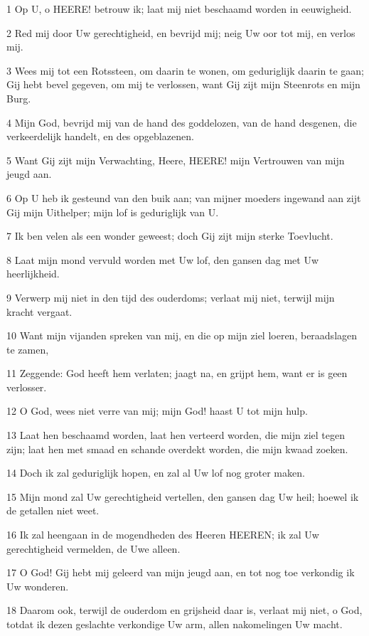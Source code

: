 \par 1 Op U, o HEERE! betrouw ik; laat mij niet beschaamd worden in eeuwigheid.
\par 2 Red mij door Uw gerechtigheid, en bevrijd mij; neig Uw oor tot mij, en verlos mij.
\par 3 Wees mij tot een Rotssteen, om daarin te wonen, om geduriglijk daarin te gaan; Gij hebt bevel gegeven, om mij te verlossen, want Gij zijt mijn Steenrots en mijn Burg.
\par 4 Mijn God, bevrijd mij van de hand des goddelozen, van de hand desgenen, die verkeerdelijk handelt, en des opgeblazenen.
\par 5 Want Gij zijt mijn Verwachting, Heere, HEERE! mijn Vertrouwen van mijn jeugd aan.
\par 6 Op U heb ik gesteund van den buik aan; van mijner moeders ingewand aan zijt Gij mijn Uithelper; mijn lof is geduriglijk van U.
\par 7 Ik ben velen als een wonder geweest; doch Gij zijt mijn sterke Toevlucht.
\par 8 Laat mijn mond vervuld worden met Uw lof, den gansen dag met Uw heerlijkheid.
\par 9 Verwerp mij niet in den tijd des ouderdoms; verlaat mij niet, terwijl mijn kracht vergaat.
\par 10 Want mijn vijanden spreken van mij, en die op mijn ziel loeren, beraadslagen te zamen,
\par 11 Zeggende: God heeft hem verlaten; jaagt na, en grijpt hem, want er is geen verlosser.
\par 12 O God, wees niet verre van mij; mijn God! haast U tot mijn hulp.
\par 13 Laat hen beschaamd worden, laat hen verteerd worden, die mijn ziel tegen zijn; laat hen met smaad en schande overdekt worden, die mijn kwaad zoeken.
\par 14 Doch ik zal geduriglijk hopen, en zal al Uw lof nog groter maken.
\par 15 Mijn mond zal Uw gerechtigheid vertellen, den gansen dag Uw heil; hoewel ik de getallen niet weet.
\par 16 Ik zal heengaan in de mogendheden des Heeren HEEREN; ik zal Uw gerechtigheid vermelden, de Uwe alleen.
\par 17 O God! Gij hebt mij geleerd van mijn jeugd aan, en tot nog toe verkondig ik Uw wonderen.
\par 18 Daarom ook, terwijl de ouderdom en grijsheid daar is, verlaat mij niet, o God, totdat ik dezen geslachte verkondige Uw arm, allen nakomelingen Uw macht.
